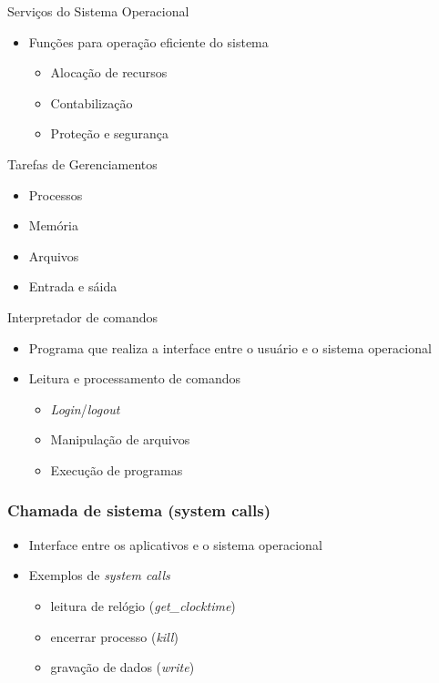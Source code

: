 \documentclass[aspectratio=169,
				xcolor=table]{beamer}
\begin{document}
	\begin{frame}{Serviços do Sistema Operacional}
		\begin{itemize}
			\item Funções para operação eficiente do sistema
			\begin{itemize}
				\item Alocação de recursos
				\item Contabilização
				\item Proteção e segurança
			\end{itemize}
		\end{itemize}
	\end{frame}	
	
	\begin{frame}{Tarefas de Gerenciamentos}
		\begin{itemize}
			\item Processos			
			\vspace{0.8em}
			\item Memória
			\vspace{0.8em}
			\item Arquivos			
			\vspace{0.8em}
			\item Entrada e sáida			
		\end{itemize}
	\end{frame}
	
	\begin{frame}{Interpretador de comandos}
	\begin{itemize}
		\item Programa que realiza a interface entre o usuário e o sistema operacional
		\vspace{1em}
		\item Leitura e processamento de comandos
		\begin{itemize}
			\item \textit{Login}/\textit{logout}
			\item Manipulação de arquivos
			\item Execução de programas
		\end{itemize}
	\end{itemize}
		
	\end{frame}
	
	\begin{frame}
		\frametitle{Chamada de sistema (system calls)}
		\begin{itemize}
			\item Interface entre os aplicativos e o sistema operacional
			\item Exemplos de \textit{system calls}
			\begin{itemize}
				\item leitura de relógio (\textit{get\_clocktime})
				\item encerrar processo (\textit{kill})
				\item gravação de dados (\textit{write})
			\end{itemize}
			
		\end{itemize}
	\end{frame}
	
\end{document}
